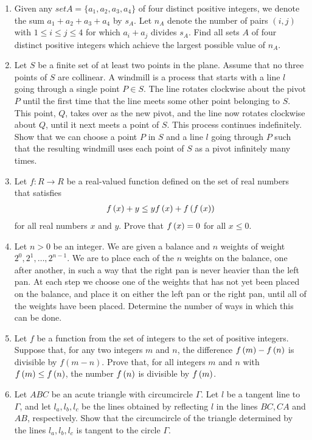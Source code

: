 \documentclass{article}
\begin{document}
\begin{enumerate}
	\item Given any $setA=\{a_{1}, a_{2}, a_{3}, a_{4}\}$ of four distinct positive integers, we denote the sum $a_{1}+a_{2}+a_{3}+a_{4}$ by $s_{A}$. Let $n_{A}$ denote the number of pairs $ ( i, j) $ with $1\leq{i}\leq{j}\leq{4}$ for which $a_{i}+a_{j}$ divides $s_{A}$. Find all sets $A$ of four distinct positive integers which achieve the largest possible value of $n_{A}$.
\item Let $S$ be a finite set of at least two points in the plane. Assume that no three points of $S$ are collinear. A windmill is a process that starts with a line $l$ going through a single point $P \in S$. The line rotates clockwise about the pivot $P$ until the first time that the line meets some other point belonging to $S$. This point, $Q$, takes over as the new pivot, and the line now rotates clockwise about $Q$, until it next meets a point of $S$. This process continues indefinitely.
	Show that we can choose a point $P$ in $S$ and a line $l$ going through $P$ such that the resulting windmill uses each point of $S$ as a pivot infinitely many times.
\item Let $f:R \rightarrow R$ be a real-valued function defined on the set of real numbers that satisfies
	\begin{align}
	f\left(x\right)+y \leq{y f\ensuremath{\left(x\right)}}+f\left(f\left(x\right)\right) 
	\end{align}
		for all real numbers $x$ and $y$. Prove that $f \left(x\right)=0$ for all $x\leq{0}$.
	\item Let $n>0$ be an integer. We are given a balance and $n$ weights of weight $2^{0}, 2^{1}, \dots, 2^{n-1}$. We are to place each of the $n$ weights on the balance, one after another, in such a way that the right pan is never heavier than the left pan. At each step we choose one of the weights that has not yet been placed on the balance, and place it on either the left pan or the right pan, until all of the weights have been placed.
		Determine the number of ways in which this can be done.
	\item  Let $f$ be a function from the set of integers to the set of positive integers. Suppose that, for any two integers $m$ and $n$, the difference $f\left(m\right) -f\left(n\right)$ is divisible by $f( m-n)$. Prove that, for all integers $m$ and $n$ with $f \left(m\right) \leq{f\ensuremath{\left(n\right)}}$, the number $f\left(n\right)$ is divisible by $f\left(m\right)$.
	\item Let $ABC$ be an acute triangle with circumcircle $\Gamma$. Let $l$ be a tangent line to $\Gamma$, and let $l_{a}, l_{b}, l_{c}$ be the lines obtained by reflecting $l$ in the lines $BC, CA$ and $AB$, respectively. Show that the circumcircle of the triangle determined by the lines $l_{a}, l_{b}, l_{c}$ is tangent to the circle $\Gamma$.
\end{enumerate}
\end{document}

